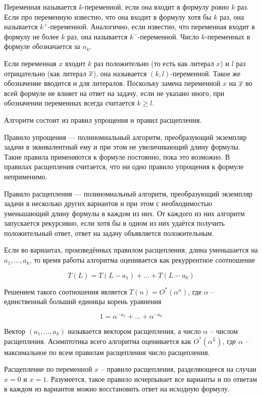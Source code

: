 Переменная называется $k$-переменной, если она входит в формулу ровно $k$ раз.
Если про переменную известно, что она входит в формулу хотя бы $k$ раз, она называется $k^+$-переменной. Аналогично, если известно, что переменная входит в формулу не более $k$ раз, она называется $k^-$-переменной. Число $k$-переменных в формуле обозначается за $n_k$.

Если переменная $x$ входит $k$ раз положительно (то есть как литерал $x$) и $l$ раз отрицательно (как литерал $\overline{x}$), она называется $(k,l)$-переменной. Такое же обозначение вводится и для литералов. Поскольку замена переменной $x$ на $\overline{x}$ во всей формуле не влияет на ответ на задачу, если не указано иного, при обозначении переменных всегда считается $k \geq l$.

Алгоритм состоит из правил упрощения и правил расщепления.

Правило упрощения — полиномиальный алгоритм, преобразующий экземпляр задачи в эквивалентный ему и при этом не увеличивающий длину формулы. Такие правила применяются к формуле постоянно, пока это возможно. В правилах расщепления считается, что ни одно правило упрощения к формуле неприменимо.

Правило расщепления — полиномиальный алгоритм, преобразующий экземпляр задачи в несколько других вариантов и при этом с необходимостью уменьшающий длину формулы в каждом из них. От каждого из них алгоритм запускается рекурсивно, если хотя бы в одном из них удаётся получить положительный ответ, ответ на задачу объявляется положительным.

Если во вариантах, произведённых правилом расщепления, длина уменьшается на $a_1, \dots, a_k$, то время работы алгоритма оценивается как рекуррентное соотношение

$$
 T(L) = T(L - a_1) + \dots + T(L - a_k)
$$

Решением такого соотношения является $T(n) = O^*(\alpha^n)$, где $\alpha$ -- единственный больший единицы корень уравнения

$$
 1 = \alpha^{-a_1} + \dots + \alpha^{-a_k}
$$

Вектор $(a_1, \dots, a_k)$ называется вектором расщепления, а число $\alpha$ -- числом расщепления. Асимптотика всего алгоритма оценивается как $O^*(\alpha^L)$, где $\alpha$ -- максимальное по всем правилам расщепления число расщепления.

Расщепление по переменной $x$ -- правило расщепления, разделяющееся на случаи $x = 0$ и $x = 1$. Разумеется, такое правило исчерпывает все варианты и по ответам в каждом из вариантов можно восстановить ответ на исходную формулу.

